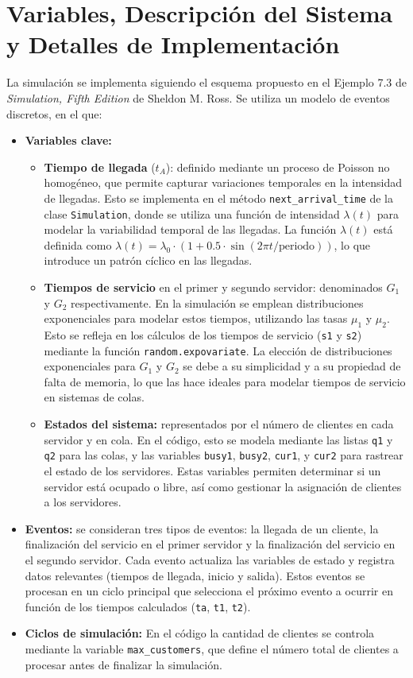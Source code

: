 \documentclass[12pt]{article}
\begin{document}
\section{Variables, Descripción del Sistema y Detalles de Implementación}
La simulación se implementa siguiendo el esquema propuesto en el Ejemplo 7.3 de \textit{Simulation, Fifth Edition} de Sheldon M. Ross. Se utiliza un modelo de eventos discretos, en el que:
\begin{itemize}
    \item \textbf{Variables clave:}
        \begin{itemize}
            \item \textbf{Tiempo de llegada} (\(t_A\)): definido mediante un proceso de Poisson no homogéneo, que permite capturar variaciones temporales en la intensidad de llegadas. Esto se implementa en el método \texttt{next\_arrival\_time} de la clase \texttt{Simulation}, donde se utiliza una función de intensidad \(\lambda(t)\) para modelar la variabilidad temporal de las llegadas. La función \(\lambda(t)\) está definida como \( \lambda(t) = \lambda_0 \cdot (1 + 0.5 \cdot \sin(2 \pi t / \text{periodo})) \), lo que introduce un patrón cíclico en las llegadas.
            \item \textbf{Tiempos de servicio} en el primer y segundo servidor: denominados \(G_1\) y \(G_2\) respectivamente. En la simulación se emplean distribuciones exponenciales para modelar estos tiempos, utilizando las tasas \(\mu_1\) y \(\mu_2\). Esto se refleja en los cálculos de los tiempos de servicio (\texttt{s1} y \texttt{s2}) mediante la función \texttt{random.expovariate}. La elección de distribuciones exponenciales para \(G_1\) y \(G_2\) se debe a su simplicidad y a su propiedad de falta de memoria, lo que las hace ideales para modelar tiempos de servicio en sistemas de colas.
            \item \textbf{Estados del sistema:} representados por el número de clientes en cada servidor y en cola. En el código, esto se modela mediante las listas \texttt{q1} y \texttt{q2} para las colas, y las variables \texttt{busy1}, \texttt{busy2}, \texttt{cur1}, y \texttt{cur2} para rastrear el estado de los servidores. Estas variables permiten determinar si un servidor está ocupado o libre, así como gestionar la asignación de clientes a los servidores.
        \end{itemize}
        \item \textbf{Eventos:} se consideran tres tipos de eventos: la llegada de un cliente, la finalización del servicio en el primer servidor y la finalización del servicio en el segundo servidor. Cada evento actualiza las variables de estado y registra datos relevantes (tiempos de llegada, inicio y salida). Estos eventos se procesan en un ciclo principal que selecciona el próximo evento a ocurrir en función de los tiempos calculados (\texttt{ta}, \texttt{t1}, \texttt{t2}).
        \item \textbf{Ciclos de simulación:} En el código la cantidad de clientes se controla mediante la variable \texttt{max\_customers}, que define el número total de clientes a procesar antes de finalizar la simulación.
\end{itemize}
\end{document}
